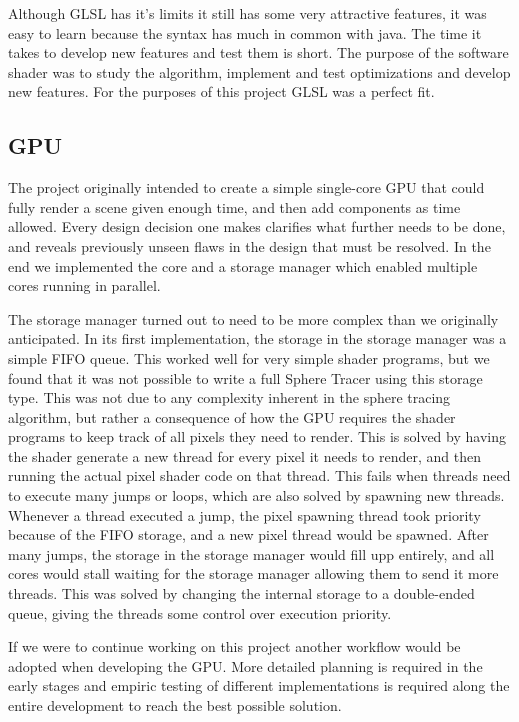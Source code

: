 			Although GLSL has it's limits it still has some very attractive
			features, it was easy to learn because the syntax has much in
			common with java. The time it takes to develop new features and
			test them is short. The purpose of the software shader was to study
			the algorithm, implement and test optimizations and develop new
			features. For the purposes of this project GLSL was a perfect fit.
		
		\subsection{GPU} 
		
			The project originally intended to create a simple single-core GPU
			that could fully render a scene given enough time, and then add	
			components as time allowed. Every design decision one makes 
			clarifies what further needs to be done, and reveals previously 
			unseen flaws in the design that must
			be resolved. In the end we implemented the core and a storage 
			manager which enabled multiple cores running in parallel.

			The storage manager turned out to need to be more complex than we 
			originally anticipated. In its first implementation, the storage in
			the storage manager was a simple FIFO queue. This worked well for 
			very simple shader programs, but we found that it was not possible
			to write a full Sphere Tracer using this storage type. This was not
			due to any complexity inherent in the sphere tracing algorithm, but
			rather a consequence of how the GPU requires the shader programs to
			keep track of all pixels they need to render. This is solved by 
			having the shader generate a new thread for every pixel it needs to
			render, and then running the actual pixel shader code on that 
			thread. This fails when threads need to execute many jumps or 
			loops, which are also solved by spawning new threads. Whenever a 
			thread executed a jump, the pixel spawning thread took priority 
			because of the FIFO storage, and a new pixel thread would be 
			spawned. After many jumps, the storage in the storage manager would 
			fill upp entirely, and all cores would stall waiting for the 
			storage manager allowing them to send it more threads. This was 
			solved by changing the internal storage to a double-ended queue,
			giving the threads some control over execution priority.

			If we were to continue working on this project another workflow
			would be adopted when developing the GPU. More detailed planning is
			required in the early stages and empiric testing of different
			implementations is required along the entire development to reach
			the best possible solution.

